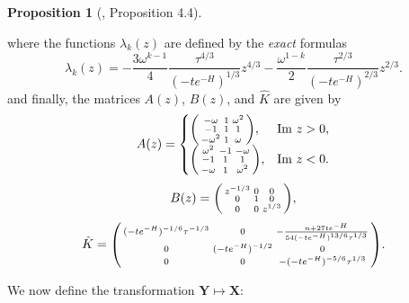 \documentclass[usenames,dvipsnames]{article}
\theoremstyle{definition}
\newtheorem{prop}{Proposition}[section]
\numberwithin{equation}{section}
\numberwithin{figure}{section}
\begin{document}
\begin{prop}[\cite{DHL1}, Proposition 4.4]
\begin{enumerate}
\begin{equation}
    \end{equation}
where the functions $\lambda_k(z)$ are defined by the \textit{exact} formulas
    \begin{equation}\label{little-theta-hat}
        \lambda_k(z) = -\frac{3\omega^{k-1}}{4} \frac{\tau^{4/3}}{(-te^{-H})^{1/3}}z^{4/3} - \frac{\omega^{1-k}}{2}\frac{\tau^{2/3}}{(-te^{-H})^{2/3}}z^{2/3}.
    \end{equation}
and finally, the matrices $A(z)$, $B(z)$, and $\hat{K}$ are given by
     \begin{equation}
        A(z) = 
            \begin{cases}
            \begin{psmallmatrix}
                -\omega & 1 & \omega^2\\
                -1 & 1 & 1\\
                -\omega^2 & 1 & \omega
            \end{psmallmatrix}, & \text{Im } z > 0,\\
            \begin{psmallmatrix}
                 \omega^2 & -1 & -\omega\\
                -1 & 1 & 1\\
                -\omega & 1 & \omega^2\\
            \end{psmallmatrix}, & \text{Im } z < 0.
            \end{cases}
        \end{equation}
        \begin{equation}
        B(z) = 
        \begin{psmallmatrix}
            z^{-1/3} & 0 & 0\\
            0 & 1 & 0\\
            0 & 0 & z^{1/3}
        \end{psmallmatrix},
    \end{equation}
    \begin{equation}
        \hat{K} = 
        \begin{psmallmatrix}
            (-te^{-H})^{-1/6}\tau^{-1/3} & 0 & -\frac{n+27 te^{-H}}{54(-te^{-H})^{13/6}\tau^{1/3}}\\
            0 & (-te^{-H})^{-1/2} & 0\\
            0 & 0 & -(-te^{-H})^{-5/6}\tau^{1/3}
        \end{psmallmatrix}.
    \end{equation}
    \end{enumerate}
\end{prop}
We now define the transformation $\boldsymbol{Y}\mapsto\boldsymbol{X}$:
\end{document}
